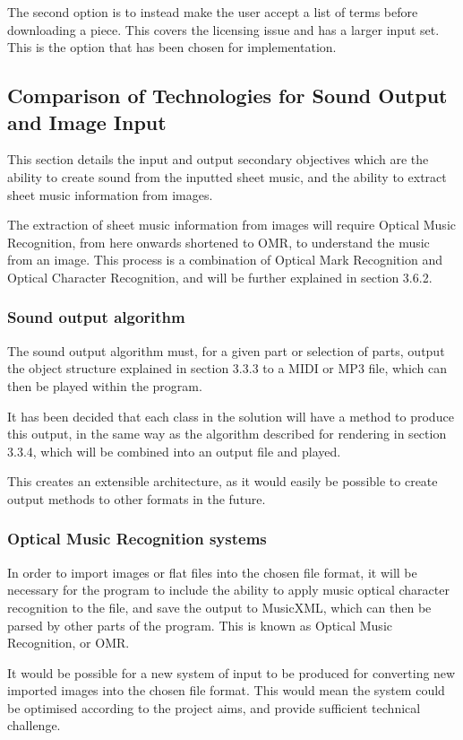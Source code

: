 The second option is to instead make the user accept a list of terms before downloading a piece. This covers the licensing issue and has a larger input set. This is the option that has been chosen for implementation.

\subsection{Comparison of Technologies for Sound Output and Image Input}
This section details the input and output secondary objectives which are the ability to create sound from the inputted sheet music, and the ability to extract sheet music information from images.

The extraction of sheet music information from images will require Optical Music Recognition, from here onwards shortened to OMR, to understand the music from an image. This process is a combination of Optical Mark Recognition and Optical Character Recognition, %
 and will be further explained in section 3.6.2.
\subsubsection{Sound output algorithm}
The sound output algorithm must, for a given part or selection of parts, output the object structure explained in section 3.3.3 to a MIDI or MP3 file, which can then be played within the program. 

It has been decided that each class in the solution will have a method to produce this output, in the same way as the algorithm described for rendering in section 3.3.4, which will be combined into an output file and played.

This creates an extensible architecture, as it would easily be possible to create output methods to other formats in the future.

\subsubsection{Optical Music Recognition systems}
In order to import images or flat files into the chosen file format, it will be necessary for the program to include the ability to apply music optical character recognition to the file, and save the output to MusicXML, which can then be parsed by other parts of the program. This is known as Optical Music Recognition, or OMR.

It would be possible for a new system of input to be produced for converting new imported images into the chosen file format. This would mean the system  could be optimised according to the project aims, and provide sufficient technical challenge.

